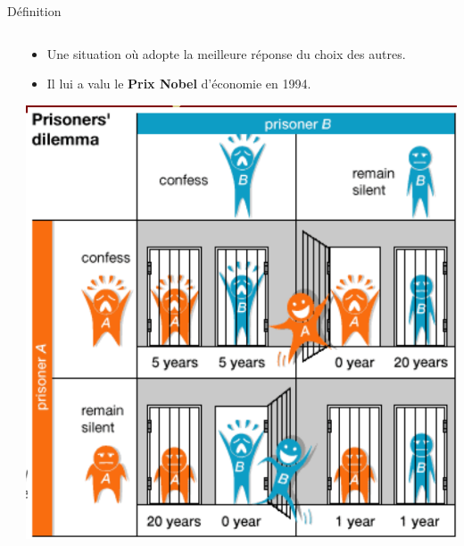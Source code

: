 \begin{frame}{Définition}
\begin{columns}
\begin{column}{0.3\textwidth}
	\end{column}
	\begin{column}{0.7\textwidth}
		\begin{itemize}
			\item Une situation o\`{u} adopte la meilleure réponse du choix des autres.
			\item Il lui a valu le  \textbf{Prix Nobel}  d'économie en 1994.
		\end{itemize}
	\centering
	\includegraphics[width=0.5\linewidth]{resources/prisonier}
	\end{column}   	
\end{columns}
\end{frame}




